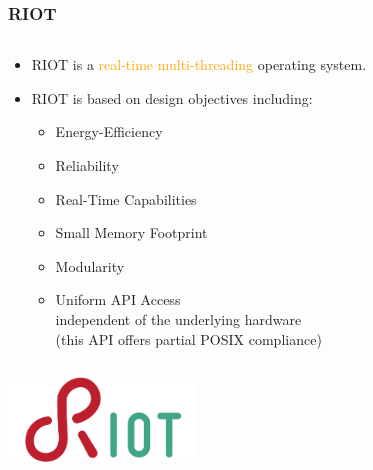 \documentclass{beamer}
\begin{document}
\begin{frame}
	\frametitle{RIOT}
	\begin{columns}[c]
		\begin{column}{30cm}
			\vspace{.1cm}
			\begin{itemize}
				\justifying
				\item RIOT is a \textcolor{orange}{real-time}
				\textcolor{orange}{multi-threading} operating system.
				\item RIOT is based on design objectives including:
				\begin{itemize}
					\justifying
					\item Energy-Efficiency
					\item Reliability
					\item Real-Time Capabilities
					\item Small Memory Footprint
					\item Modularity
					\item Uniform API Access\\
					independent of the underlying hardware\\
					(this API offers partial POSIX compliance)
				\end{itemize}
			\end{itemize}
		\end{column}
	\end{columns}
	\vspace{.5cm}
	\hspace*{5.5cm} \includegraphics[width=5cm]{figs/riot-logo.png}
\end{frame}
\end{document}
